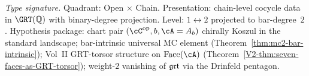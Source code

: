 \begin{theorem}
\label{thm:hdm-grt-cocycle-record}
\emph{Type signature.} Quadrant: Open $\times$ Chain. Presentation:
chain-level cocycle data in $\GRT(\mathbb{Q})$ with binary-degree
projection. Level: $1\leftrightarrow 2$ projected to bar-degree~$2$.
Hypothesis package: chart pair $(\cC^{\mathrm{op}}, b, \cA = A_b)$
chirally Koszul in the standard landscape; bar-intrinsic universal
MC element (Theorem~\textup{\ref{thm:mc2-bar-intrinsic}}); Vol~II
GRT-torsor structure on $\Face(\cA)$
\textup{(}Theorem~\textup{\ref{V2-thm:seven-faces-as-GRT-torsor}}\textup{);}
weight-$2$ vanishing of $\mathfrak{grt}$ via the Drinfeld pentagon.


\end{theorem}
